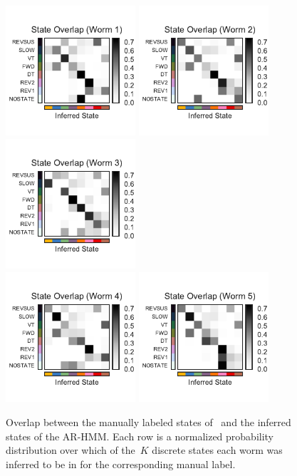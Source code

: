 \documentclass{article}
\begin{document}
\begin{figure}[h]
\centering%
\includegraphics[width=1.9in]{figures/arhmm/overlap_0.pdf}
\includegraphics[width=1.9in]{figures/arhmm/overlap_1.pdf}
\includegraphics[width=1.9in]{figures/arhmm/overlap_2.pdf}
\\
\includegraphics[width=1.9in]{figures/arhmm/overlap_3.pdf}
\includegraphics[width=1.9in]{figures/arhmm/overlap_4.pdf} 
\caption{Overlap between the manually labeled states of~\citet{kato2015global}
  and the inferred states of the AR-HMM. Each row is a normalized probability
  distribution over which of the~$K$ discrete states each worm was inferred to
  be in for the corresponding manual label.}
\label{fig:overlap}
\end{figure}
\end{document}
